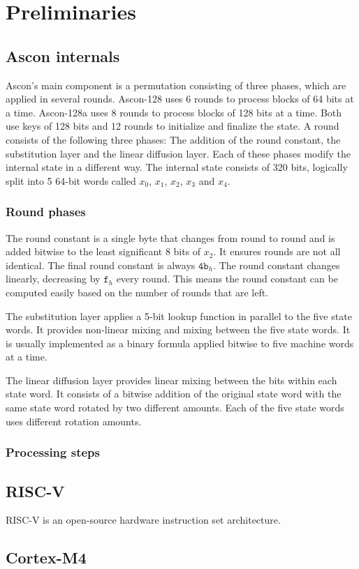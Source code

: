 \section{Preliminaries}

\subsection{Ascon internals}

Ascon's main component is a permutation consisting of three phases, which are
applied in several rounds. Ascon-128 uses 6 rounds to process blocks of 64 bits
at a time. Ascon-128a uses 8 rounds to process blocks of 128 bits at a time.
Both use keys of 128 bits and 12 rounds to initialize and finalize the state. A
round consists of the following three phases: The addition of the round
constant, the substitution layer and the linear diffusion layer. Each of these
phases modify the internal state in a different way. The internal state consists
of 320 bits, logically split into 5 64-bit words called $x_0$, $x_1$, $x_2$,
$x_3$ and $x_4$.

\subsubsection{Round phases}

The round constant is a single byte that changes from round to round and is
added bitwise to the least significant 8 bits of $x_2$. It ensures rounds are
not all identical. The final round constant is always $\mathtt{4b}_h$. The round
constant changes linearly, decreasing by $\mathtt{f}_h$ every round. This means
the round constant can be computed easily based on the number of rounds that are
left.

The substitution layer applies a 5-bit lookup function in parallel to the five
state words. It provides non-linear mixing and mixing between the five state
words. It is usually implemented as a binary formula applied bitwise to five
machine words at a time.

The linear diffusion layer provides linear mixing between the bits within each
state word. It consists of a bitwise addition of the original state word with
the same state word rotated by two different amounts. Each of the five state
words uses different rotation amounts.

\subsubsection{Processing steps}



\subsection{RISC-V}
RISC-V\cite{riscv} is an open-source hardware instruction set architecture.

\subsection{Cortex-M4}

